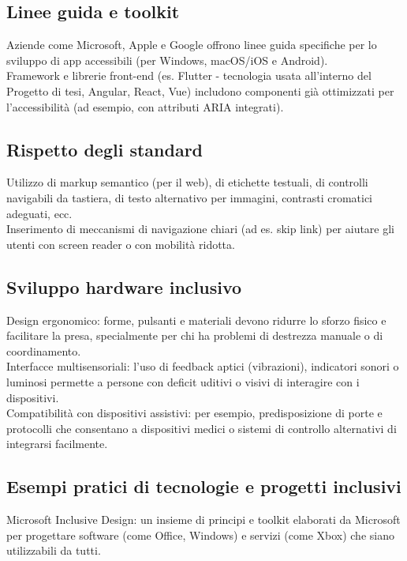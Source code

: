 \documentclass[14pt]{extbook}
\begin{document}
\subsection{Linee guida e toolkit}
Aziende come Microsoft, Apple e Google offrono linee guida specifiche per lo sviluppo di app accessibili (per Windows, macOS/iOS e Android).\\

Framework e librerie front-end (es. Flutter - tecnologia usata all'interno del Progetto di tesi, Angular, React, Vue) includono componenti già ottimizzati per l’accessibilità (ad esempio, con attributi ARIA integrati).\\

\subsection{Rispetto degli standard}
Utilizzo di markup semantico (per il web), di etichette testuali, di controlli navigabili da tastiera, di testo alternativo per immagini, contrasti cromatici adeguati, ecc.\\
        
Inserimento di meccanismi di navigazione chiari (ad es. skip link) per aiutare gli utenti con screen reader o con mobilità ridotta.\\

\subsection{Sviluppo hardware inclusivo}
Design ergonomico: forme, pulsanti e materiali devono ridurre lo sforzo fisico e facilitare la presa, specialmente per chi ha problemi di destrezza manuale o di coordinamento.\\

Interfacce multisensoriali: l’uso di feedback aptici (vibrazioni), indicatori sonori o luminosi permette a persone con deficit uditivi o visivi di interagire con i dispositivi.\\

Compatibilità con dispositivi assistivi: per esempio, predisposizione di porte e protocolli che consentano a dispositivi medici o sistemi di controllo alternativi di integrarsi facilmente.\\

\subsection{Esempi pratici di tecnologie e progetti inclusivi}
Microsoft Inclusive Design: un insieme di principi e toolkit elaborati da Microsoft per progettare software (come Office, Windows) e servizi (come Xbox) che siano utilizzabili da tutti.\\
    
\end{document}
